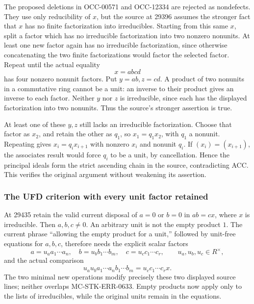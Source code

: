 The proposed deletions in OCC-00571 and OCC-12334 are rejected as nondefects. They use only reducibility of \(x\), but the source at 29396 assumes the stronger fact that \(x\) has no finite factorization into irreducibles. Starting from this same \(x\), split a factor which has no irreducible factorization into two nonzero nonunits. At least one new factor again has no irreducible factorization, since otherwise concatenating the two finite factorizations would factor the selected factor. Repeat until the actual equality \[
 x=a b c d
\] has four nonzero nonunit factors. Put \(y=ab,z=cd\). A product of two nonunits in a commutative ring cannot be a unit: an inverse to their product gives an inverse to each factor. Neither \(y\) nor \(z\) is irreducible, since each has the displayed factorization into two nonunits. Thus the source's stronger assertion is true.

At least one of these \(y,z\) still lacks an irreducible factorization. Choose that factor as \(x_2\), and retain the other as \(q_1\), so \(x_1=q_1x_2\), with \(q_1\) a nonunit. Repeating gives \(x_i=q_i x_{i+1}\) with nonzero \(x_i\) and nonunit \(q_i\). If \((x_i)=(x_{i+1})\), the associates result would force \(q_i\) to be a unit, by cancellation. Hence the principal ideals form the strict ascending chain in the source, contradicting ACC. This verifies the original argument without weakening its assertion.

\subsubsection{The UFD criterion with every unit factor retained}\label{algebra-proof-029-the-ufd-criterion-with-every-unit-factor-retained}

At 29435 retain the valid current disposal of \(a=0\) or \(b=0\) in \(ab=cx\), where \(x\) is irreducible. Then \(a,b,c\ne0\). An arbitrary unit is not the empty product \(1\). The current phrase ``allowing the empty product for a unit,'' followed by unit-free equations for \(a,b,c\), therefore needs the explicit scalar factors \[
 a=u_a a_1\cdots a_n,\quad
 b=u_b b_1\cdots b_m,\quad
 c=u_c c_1\cdots c_r,\qquad u_a,u_b,u_c\in R^\times,
\] and the actual comparison \[
 u_a u_b a_1\cdots a_n b_1\cdots b_m
       =u_c c_1\cdots c_r x.
\] The two minimal new operations modify precisely these two displayed source lines; neither overlaps MC-STK-ERR-0633. Empty products now apply only to the lists of irreducibles, while the original units remain in the equations.

